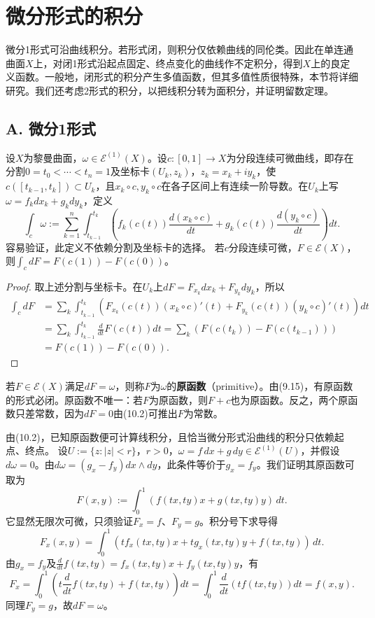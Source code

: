 \section{微分形式的积分}
微分1形式可沿曲线积分。若形式闭，则积分仅依赖曲线的同伦类。因此在单连通曲面$X$上，对闭1形式沿起点固定、终点变化的曲线作不定积分，得到$X$上的良定义函数。一般地，闭形式的积分产生多值函数，但其多值性质很特殊，本节将详细研究。我们还考虑2形式的积分，以把线积分转为面积分，并证明留数定理。
\subsection*{A. 微分1形式}
设$X$为黎曼曲面，$\omega\in\mathcal E^{(1)}(X)$。设$c:[0,1]\to X$为分段连续可微曲线，即存在分割$0=t_0<\cdots<t_n=1$及坐标卡$(U_k,z_k)$，$z_k=x_k+iy_k$，使$c([t_{k-1},t_k])\subset U_k$，且$x_k\circ c,y_k\circ c$在各子区间上有连续一阶导数。在$U_k$上写$\omega=f_kdx_k+g_kdy_k$，定义
\[
\int_c\omega:=\sum_{k=1}^n\int_{t_{k-1}}^{t_k}
\left(f_k(c(t))\frac{d(x_k\circ c)}{dt}+g_k(c(t))\frac{d(y_k\circ c)}{dt}\right)dt.
\]
容易验证，此定义不依赖分割及坐标卡的选择。
若$c$分段连续可微，$F\in\mathcal E(X)$，则$\int_c dF=F(c(1))-F(c(0))$。
\begin{proof}
取上述分割与坐标卡。在$U_k$上$dF=F_{x_k}dx_k+F_{y_k}dy_k$，所以
\begin{align*}
\int_c dF&=\sum_k\int_{t_{k-1}}^{t_k}\left(F_{x_k}(c(t))(x_k\circ c)'(t)+F_{y_k}(c(t))(y_k\circ c)'(t)\right)dt\\
&=\sum_k\int_{t_{k-1}}^{t_k}\frac d{dt}F(c(t))dt
=\sum_k(F(c(t_k))-F(c(t_{k-1})))\\&=F(c(1))-F(c(0)).
\end{align*}
\end{proof}
若$F\in\mathcal E(X)$满足$dF=\omega$，则称$F$为$\omega$的\textbf{原函数}（primitive）。由(9.15)，有原函数的形式必闭。原函数不唯一：若$F$为原函数，则$F+c$也为原函数。反之，两个原函数只差常数，因为$dF=0$由(10.2)可推出$F$为常数。

由(10.2)，已知原函数便可计算线积分，且恰当微分形式沿曲线的积分只依赖起点、终点。
设$U:=\{z:|z|<r\}$，$r>0$，$\omega=f\,dx+g\,dy\in\mathcal E^{(1)}(U)$，并假设$d\omega=0$。由$d\omega=(g_x-f_y)dx\wedge dy$，此条件等价于$g_x=f_y$。我们证明其原函数可取为
\[
F(x,y):=\int_0^1(f(tx,ty)x+g(tx,ty)y)\,dt.
\]
它显然无限次可微，只须验证$F_x=f$、$F_y=g$。积分号下求导得
\[
F_x(x,y)=\int_0^1(tf_x(tx,ty)x+tg_x(tx,ty)y+f(tx,ty))\,dt.
\]
由$g_x=f_y$及$\frac d{dt}f(tx,ty)=f_x(tx,ty)x+f_y(tx,ty)y$，有
\[
F_x=\int_0^1\left(t\frac d{dt}f(tx,ty)+f(tx,ty)\right)dt
=\int_0^1\frac d{dt}(tf(tx,ty))dt=f(x,y).
\]
同理$F_y=g$，故$dF=\omega$。

